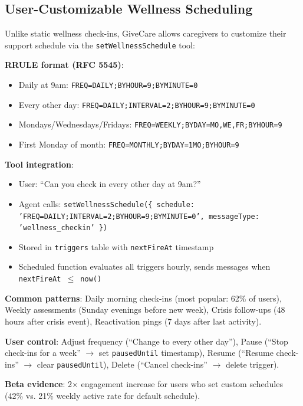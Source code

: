 \documentclass{article}%
\begin{document}
%
\subsection{User{-}Customizable Wellness Scheduling}%
\label{subsec:User{-}CustomizableWellnessScheduling}%
Unlike static wellness check-ins, GiveCare allows caregivers to customize their support schedule via the \texttt{setWellnessSchedule} tool:

\textbf{RRULE format (RFC 5545)}:
\begin{itemize}
    \item Daily at 9am: \texttt{FREQ=DAILY;BYHOUR=9;BYMINUTE=0}
    \item Every other day: \texttt{FREQ=DAILY;INTERVAL=2;BYHOUR=9;BYMINUTE=0}
    \item Mondays/Wednesdays/Fridays: \texttt{FREQ=WEEKLY;BYDAY=MO,WE,FR;BYHOUR=9}
    \item First Monday of month: \texttt{FREQ=MONTHLY;BYDAY=1MO;BYHOUR=9}
\end{itemize}

\textbf{Tool integration}:
\begin{itemize}
    \item User: ``Can you check in every other day at 9am?''
    \item Agent calls: \texttt{setWellnessSchedule(\{ schedule: 'FREQ=DAILY;INTERVAL=2;BYHOUR=9;BYMINUTE=0', messageType: 'wellness\_checkin' \})}
    \item Stored in \texttt{triggers} table with \texttt{nextFireAt} timestamp
    \item Scheduled function evaluates all triggers hourly, sends messages when \texttt{nextFireAt $\leq$ now()}
\end{itemize}

\textbf{Common patterns}: Daily morning check-ins (most popular: 62\% of users), Weekly assessments (Sunday evenings before new week), Crisis follow-ups (48 hours after crisis event), Reactivation pings (7 days after last activity).

\textbf{User control}: Adjust frequency (``Change to every other day''), Pause (``Stop check-ins for a week'' $\rightarrow$ set \texttt{pausedUntil} timestamp), Resume (``Resume check-ins'' $\rightarrow$ clear \texttt{pausedUntil}), Delete (``Cancel check-ins'' $\rightarrow$ delete trigger).

\textbf{Beta evidence}: 2$\times$ engagement increase for users who set custom schedules (42\% vs. 21\% weekly active rate for default schedule).
\end{document}
